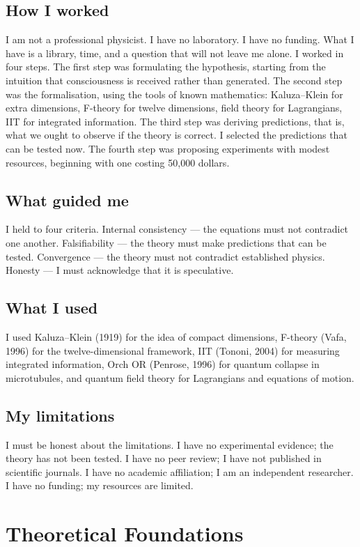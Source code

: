\documentclass[11pt,a4paper]{article}
\begin{document}
\subsection{How I worked}
I am not a professional physicist. I have no laboratory. I have no funding. What I have is a library, time, and a question that will not leave me alone. I worked in four steps. The first step was formulating the hypothesis, starting from the intuition that consciousness is received rather than generated. The second step was the formalisation, using the tools of known mathematics: Kaluza--Klein for extra dimensions, F-theory for twelve dimensions, field theory for Lagrangians, IIT for integrated information. The third step was deriving predictions, that is, what we ought to observe if the theory is correct. I selected the predictions that can be tested now. The fourth step was proposing experiments with modest resources, beginning with one costing 50,000 dollars.

\subsection{What guided me}
I held to four criteria. Internal consistency --- the equations must not contradict one another. Falsifiability --- the theory must make predictions that can be tested. Convergence --- the theory must not contradict established physics. Honesty --- I must acknowledge that it is speculative.

\subsection{What I used}
I used Kaluza--Klein (1919) for the idea of compact dimensions, F-theory (Vafa, 1996) for the twelve-dimensional framework, IIT (Tononi, 2004) for measuring integrated information, Orch OR (Penrose, 1996) for quantum collapse in microtubules, and quantum field theory for Lagrangians and equations of motion.

\subsection{My limitations}
I must be honest about the limitations. I have no experimental evidence; the theory has not been tested. I have no peer review; I have not published in scientific journals. I have no academic affiliation; I am an independent researcher. I have no funding; my resources are limited.
\section{Theoretical Foundations}
\end{document}
